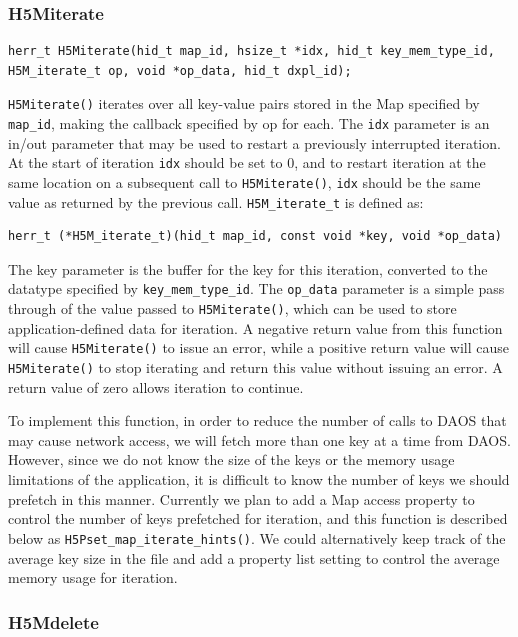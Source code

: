 \subsubsection{H5Miterate}

{
\begin{lstlisting}
herr_t H5Miterate(hid_t map_id, hsize_t *idx, hid_t key_mem_type_id, H5M_iterate_t op, void *op_data, hid_t dxpl_id);
\end{lstlisting}
}

\verb+H5Miterate()+ iterates over all key-value pairs stored in the Map specified by \verb+map_id+, making the callback specified by op for each. The \verb+idx+ parameter is an in/out parameter that may be used to restart a previously interrupted iteration. At the start of iteration \verb+idx+ should be set to 0, and to restart iteration at the same location on a subsequent call to \verb+H5Miterate()+, \verb+idx+ should be the same value as returned by the previous call.
\verb+H5M_iterate_t+ is defined as:
{
\begin{lstlisting}
herr_t (*H5M_iterate_t)(hid_t map_id, const void *key, void *op_data)
\end{lstlisting}
}

The key parameter is the buffer for the key for this iteration, converted to the datatype specified by \verb+key_mem_type_id+. The \verb+op_data+ parameter is a simple pass through of the value passed to \verb+H5Miterate()+, which can be used to store application-defined data for iteration. A negative return value from this function will cause \verb+H5Miterate()+ to issue an error, while a positive return value will cause \verb+H5Miterate()+ to stop iterating and return this value without issuing an error. A return value of zero allows iteration to continue.

To implement this function, in order to reduce the number of calls to DAOS that may cause network access, we will fetch more than one key at a time from DAOS. However, since we do not know the size of the keys or the memory usage limitations of the application, it is difficult to know the number of keys we should prefetch in this manner. Currently we plan to add a Map access property to control the number of keys prefetched for iteration, and this function is described below as \verb+H5Pset_map_iterate_hints()+. We could alternatively keep track of the average key size in the file and add a property list setting to control the average memory usage for iteration.

\subsubsection{H5Mdelete}

